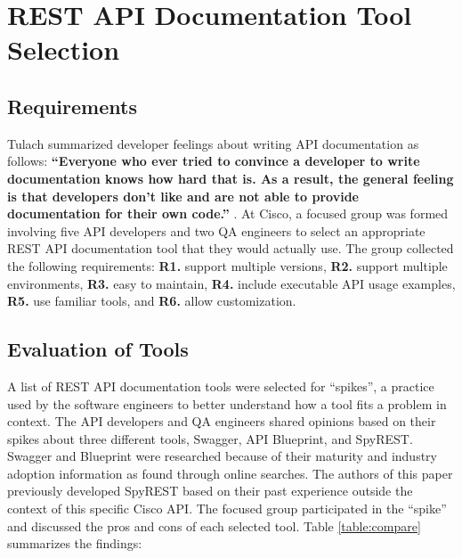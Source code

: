 \section{REST API Documentation Tool Selection}

\subsection{Requirements}

Tulach summarized developer feelings about writing API documentation as follows: \textbf{``Everyone who ever tried to convince a developer to write documentation knows how hard that is.
As a result, the general feeling is that developers don't like and are not able to provide documentation for their own code.''} \cite{Tulach2008}. At Cisco, a focused group was formed involving five API developers and two QA engineers to select an appropriate REST API documentation tool that they would actually use. The group collected the following requirements: \textbf{R1.} support multiple versions, \textbf{R2.} support multiple environments, \textbf{R3.} easy to maintain, \textbf{R4.} include executable API usage examples, \textbf{R5.} use familiar tools, and \textbf{R6.} allow customization.

\subsection{Evaluation of Tools}
A list of REST API documentation tools were selected for ``spikes'', a practice used by the software engineers to better understand how a tool fits a problem in context. The API developers and QA engineers shared opinions based on their spikes about three different tools, Swagger, API Blueprint, and SpyREST. Swagger and Blueprint were researched because of their maturity and industry adoption information as found through online searches. The authors of this paper previously developed SpyREST based on their past experience outside the context of this specific Cisco API. The focused group participated in the ``spike'' and discussed the pros and cons of each selected tool. Table \ref{table:compare} summarizes the findings:

